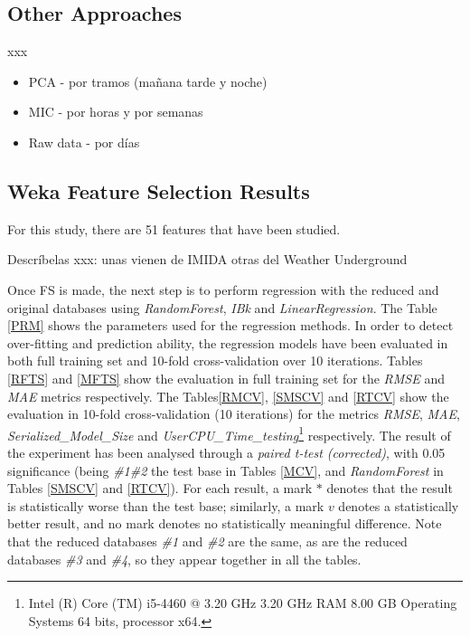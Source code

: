 \documentclass[journal,twoside,web]{ieeecolor}
\begin{document}
\subsection{Other Approaches}

xxx

\begin{itemize}

\item PCA - por tramos (mañana tarde y noche)

\cite{gonzalez2016towards}

\item MIC - por horas y por semanas

\cite{Vantuch2018}

\item Raw data - por días

\cite{Gonzalez2017}

\end{itemize}




\subsection{Weka Feature Selection Results}

For this study, there are 51 features that have been studied.

Descríbelas xxx: unas vienen de IMIDA otras del Weather Underground


Once FS is made, the next step is to perform regression with the reduced and original databases using \textit{RandomForest}, \textit{IBk} and \textit{LinearRegression}. The Table \ref{PRM} shows the parameters used for the regression methods. In order to detect over-fitting and prediction ability, the regression models have been evaluated in both full training set and 10-fold cross-validation over 10 iterations. Tables \ref{RFTS} and \ref{MFTS} show the evaluation in full training set for the \textit{RMSE} and \textit{MAE} metrics respectively. The Tables\ref{RMCV}, \ref{SMSCV} and \ref{RTCV}
show the evaluation in 10-fold cross-validation (10 iterations) for the metrics \textit{RMSE}, \textit{MAE}, \textit{Serialized\_Model\_Size} and \textit{UserCPU\_Time\_testing}\footnote{Intel (R) Core (TM) i5-4460 @ 3.20 GHz 3.20 GHz RAM 8.00 GB Operating Systems 64 bits, processor x64.} respectively. The result of the experiment has been analysed through a \textit{paired t-test (corrected)},
with 0.05 significance (being \textit{\#1\#2} 
the test base in Tables \ref{MCV}, and \textit{RandomForest} in Tables \ref{SMSCV} and \ref{RTCV}). For each result, a mark $*$ denotes that the
result is statistically worse than the test base; similarly, a
mark $v$ denotes a statistically better result, and no mark denotes no statistically meaningful difference. Note that the reduced databases \textit{\#1} and \textit{\#2} are the same, as are the reduced databases \textit{\#3} and  \textit{\#4}, so they appear together in all the tables.
\end{document}
